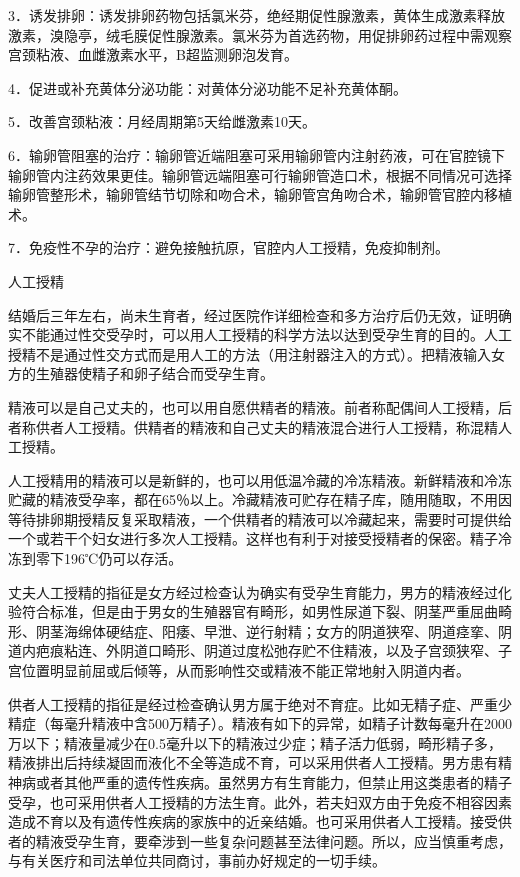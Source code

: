 \documentclass[12pt,UTF8,openany]{ctexbook}
\begin{document}
3．诱发排卵：诱发排卵药物包括氯米芬，绝经期促性腺激素，黄体生成激素释放激素，溴隐亭，绒毛膜促性腺激素。氯米芬为首选药物，用促排卵药过程中需观察宫颈粘液、血雌激素水平，B超监测卵泡发育。

4．促进或补充黄体分泌功能：对黄体分泌功能不足补充黄体酮。

5．改善宫颈粘液：月经周期第5天给雌激素10天。

6．输卵管阻塞的治疗：输卵管近端阻塞可采用输卵管内注射药液，可在官腔镜下输卵管内注药效果更佳。输卵管远端阻塞可行输卵管造口术，根据不同情况可选择输卵管整形术，输卵管结节切除和吻合术，输卵管宫角吻合术，输卵管官腔内移植术。

7．免疫性不孕的治疗：避免接触抗原，官腔内人工授精，免疫抑制剂。

人工授精

结婚后三年左右，尚未生育者，经过医院作详细检查和多方治疗后仍无效，证明确实不能通过性交受孕时，可以用人工授精的科学方法以达到受孕生育的目的。人工授精不是通过性交方式而是用人工的方法（用注射器注入的方式）。把精液输入女方的生殖器使精子和卵子结合而受孕生育。

精液可以是自己丈夫的，也可以用自愿供精者的精液。前者称配偶间人工授精，后者称供者人工授精。供精者的精液和自己丈夫的精液混合进行人工授精，称混精人工授精。

人工授精用的精液可以是新鲜的，也可以用低温冷藏的冷冻精液。新鲜精液和冷冻贮藏的精液受孕率，都在65％以上。冷藏精液可贮存在精子库，随用随取，不用因等待排卵期授精反复采取精液，一个供精者的精液可以冷藏起来，需要时可提供给一个或若干个妇女进行多次人工授精。这样也有利于对接受授精者的保密。精子冷冻到零下196℃仍可以存活。

丈夫人工授精的指征是女方经过检查认为确实有受孕生育能力，男方的精液经过化验符合标准，但是由于男女的生殖器官有畸形，如男性尿道下裂、阴茎严重屈曲畸形、阴茎海绵体硬结症、阳痿、早泄、逆行射精；女方的阴道狭窄、阴道痉挛、阴道内疤痕粘连、外阴道口畸形、阴道过度松弛存贮不住精液，以及子宫颈狭窄、子宫位置明显前屈或后倾等，从而影响性交或精液不能正常地射入阴道内者。

供者人工授精的指征是经过检查确认男方属于绝对不育症。比如无精子症、严重少精症（每毫升精液中含500万精子）。精液有如下的异常，如精子计数每毫升在2000万以下；精液量减少在0.5毫升以下的精液过少症；精子活力低弱，畸形精子多，精液排出后持续凝固而液化不全等造成不育，可以采用供者人工授精。男方患有精神病或者其他严重的遗传性疾病。虽然男方有生育能力，但禁止用这类患者的精子受孕，也可采用供者人工授精的方法生育。此外，若夫妇双方由于免疫不相容因素造成不育以及有遗传性疾病的家族中的近亲结婚。也可采用供者人工授精。接受供者的精液受孕生育，要牵涉到一些复杂问题甚至法律问题。所以，应当慎重考虑，与有关医疗和司法单位共同商讨，事前办好规定的一切手续。
\end{document}
